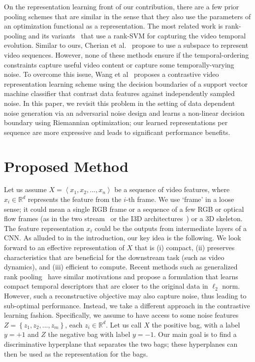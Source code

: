 \documentclass[runningheads]{llncs}
\newcommand{\reals}[1]{\mathbb{R}^{#1}}
\newcommand{\set}[1]{\left\{#1\right\}}
\renewcommand\cdots{...}
\begin{document}
On the representation learning front of our contribution, there are a few prior pooling schemes that are similar in the sense that they also use the parameters of an optimization functional as a representation. The most related work is rank-pooling and its variants~\cite{fernando2016learning,fernando2015modeling,fernando2016discriminative,su2016hierarchical,bilen2017action,cherian2018non,wang2017ordered} that use a rank-SVM for capturing the video temporal evolution. Similar to ours, Cherian et al.~\cite{grp} propose to use a subspace  to represent video sequences. However, none of these methods ensure if the temporal-ordering constraints capture useful video content or capture some temporally-varying noise. To overcome this issue, Wang et al~\cite{wang2018video} proposes a contrastive video representation learning scheme using the decision boundaries of a support vector machine classifier that contrast data features against independently sampled noise. In this paper, we revisit this problem in the setting of data dependent noise generation via an adversarial noise design and learns a non-linear decision boundary using Riemannian optimization; our learned representations per sequence are more expressive and leads to significant performance benefits.  \section{Proposed Method}
Let us assume $X=\left<x_1, x_2, \cdots, x_n\right>$ be a sequence of video features, where $x_i\in\reals{d}$ represents the feature from the $i$-th frame. We use `frame' in a loose sense; it could mean a single RGB frame or a sequence of a few RGB or optical flow frames (as in the two stream~\cite{simonyan2014very} or the I3D architectures~\cite{carreira2017quo}) or a 3D skeleton. The feature representation $x_i$ could be the outputs from intermediate layers of a CNN. As alluded to in the introduction, our key idea is the following. We look forward to an effective representation of $X$ that is (i) compact, (ii) preserves characteristics that are beneficial for the downstream task (such as video dynamics), and (iii) efficient to compute. Recent methods such as generalized rank pooling~\cite{grp} have similar motivations and propose a formulation that learns compact temporal descriptors that are closer to the original data in $\ell_2$ norm. However, such a reconstructive objective may also capture noise, thus leading to sub-optimal performance. Instead, we take a different approach in the contrastive learning fashion. Specifically, we assume to have access to some noise features $Z=\set{z_1, z_2,\cdots, z_m}$, each $z_i\in\reals{d}$. Let us call $X$ the positive bag, with a label $y=+1$ and $Z$ the negative bag with label $y=-1$. Our main goal is to find a discriminative hyperplane that separates the two bags; these hyperplanes can then be used as the representation for the bags. 
\end{document}
